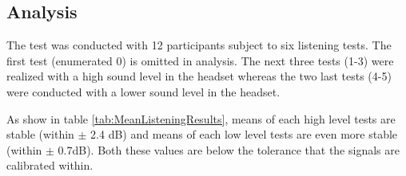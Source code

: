 \subsection{Analysis}

The test was conducted with 12 participants subject to six listening tests. The first test (enumerated 0) is omitted in analysis. The next three tests (1-3) were realized with a high sound level in the headset whereas the two last tests (4-5) were conducted with a lower sound level in the headset. 


As show in table \ref{tab:MeanListeningResults}, means of each high level tests are stable (within $\pm$ 2.4 dB) and means of each low level tests are even more stable (within $\pm$ 0.7dB). Both these values are below the tolerance that the signals are calibrated within. 

